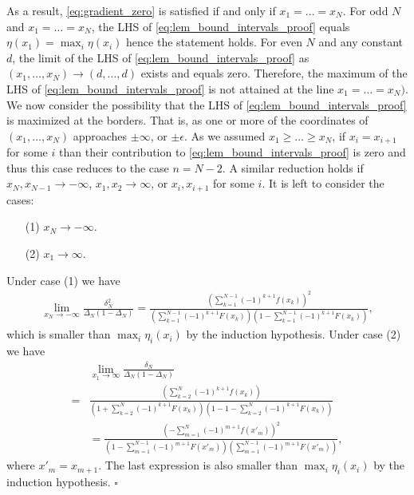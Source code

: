 \documentclass[letterpaper, 11pt]{IEEEtran}      %
\newcommand*{\QEDA}{\hfill\ensuremath{\square}}
\begin{document}
As a result, \eqref{eq:gradient_zero} is satisfied if and only if $x_1 = \ldots = x_N$. For odd $N$ and $x_1=\ldots =x_N$, the LHS of \eqref{eq:lem_bound_intervals_proof} equals $\eta(x_1) = \max_i \eta(x_i)$ hence the statement holds. For even $N$ and any constant $d$, the limit of the LHS of \eqref{eq:lem_bound_intervals_proof} as $(x_1,\ldots,x_N)\rightarrow (d,\ldots,d)$ exists and equals zero. Therefore, the maximum of the LHS of \eqref{eq:lem_bound_intervals_proof} is not attained at the line $x_1=\ldots=x_N)$. We now consider the possibility that the LHS of \eqref{eq:lem_bound_intervals_proof} is maximized at the borders. That is, as one or more of the coordinates of $(x_1,\ldots,x_N)$ approaches $\pm \infty$,  or $\pm \epsilon$. As we assumed $x_1 \geq \ldots \geq x_N$, if $x_i = x_{i+1}$ for some $i$ than their contribution to \eqref{eq:lem_bound_intervals_proof} is zero and thus this case reduces to the case $n= N-2$. A similar reduction holds if $x_N, x_{N-1} \to -\infty$, $x_1, x_2 \to \infty$, or  $x_i, x_{i+1}$ for some $i$. It is left to consider the cases:
\begin{itemize}
\item[(1)]  $x_N \to -\infty$.
\item[(2)] $x_1 \to \infty$.
\end{itemize}
Under case (1) we have
\begin{align*}
\lim_{x_N \to -\infty} \frac{  \delta_N^2} 
{\Delta_N \left(1- \Delta_N \right) }
 = \frac{ \left(  \sum_{k=1}^{N-1} (-1)^{k+1}f(x_k) \right)^2} 
{\left( \sum_{k=1}^{N-1} (-1)^{k+1} F(x_k) \right) \left(1- \sum_{k=1}^{N-1} (-1)^{k+1} F(x_k)  \right)} ,
\end{align*}
which is smaller than $\max_i \eta_i(x_i)$ by the induction hypothesis. Under case (2) we have
\begin{align*}
&  \lim_{x_1 \to \infty}
\frac{ \delta_N} 
{\Delta_N\left(1- \Delta_N \right) } \\
=
& \frac{ \left(  \sum_{k=2}^{N} (-1)^{k+1}f(x_k) \right)} 
{\left( 1 + \sum_{k=2}^{N} (-1)^{k+1} F(x_k) \right) \left(1- 1 - \sum_{k=2}^{N} (-1)^{k+1} F(x_k)  \right) }  \\
& = \frac{ \left(  -\sum_{m=1}^{N} (-1)^{m+1}f(x'_m) \right)^2 } 
{\left( 1 - \sum_{m=1}^{N-1} (-1)^{m+1} F(x'_{m}) \right)\left( \sum_{m=1}^{N-1} (-1)^{m+1} F(x'_{m})  \right) },
\end{align*}
where $x'_{m} = x_{m+1}$. The last expression is also smaller than $\max_i \eta_i(x_i)$ by the induction hypothesis.  \QEDA \\
\end{document}
